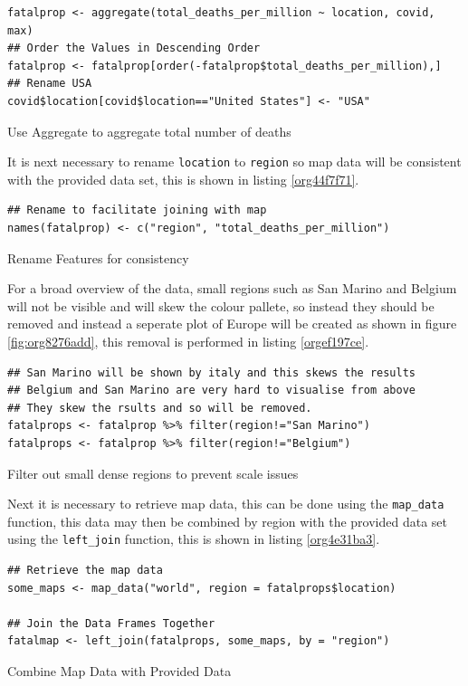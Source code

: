 \documentclass[11pt]{article}
\begin{document}
\begin{listing}[htbp]
\begin{verbatim}
fatalprop <- aggregate(total_deaths_per_million ~ location, covid, max)
## Order the Values in Descending Order
fatalprop <- fatalprop[order(-fatalprop$total_deaths_per_million),]
## Rename USA
covid$location[covid$location=="United States"] <- "USA"
\end{verbatim}
\caption{\label{org420cba7}Use Aggregate to aggregate total number of deaths}
\end{listing}


It is next necessary to rename \texttt{location} to \texttt{region} so map data will be
consistent with the provided data set, this is shown in listing \ref{org44f7f71}.

\begin{listing}[htbp]
\begin{verbatim}
## Rename to facilitate joining with map
names(fatalprop) <- c("region", "total_deaths_per_million")
\end{verbatim}
\caption{\label{org44f7f71}Rename Features for consistency}
\end{listing}

For a broad overview of the data, small regions such as San Marino and Belgium
will not be visible and will skew the colour pallete, so instead they should be removed
and instead a seperate plot of Europe will be created as shown in figure \ref{fig:org8276add}, this removal is performed in
listing \ref{orgef197ce}.

\begin{listing}[htbp]
\begin{verbatim}
## San Marino will be shown by italy and this skews the results
## Belgium and San Marino are very hard to visualise from above
## They skew the rsults and so will be removed.
fatalprops <- fatalprop %>% filter(region!="San Marino")
fatalprops <- fatalprop %>% filter(region!="Belgium")
\end{verbatim}
\caption{\label{orgef197ce}Filter out small dense regions to prevent scale issues}
\end{listing}


Next it is necessary to retrieve map data, this can be done using the \texttt{map\_data}
function, this data may then be combined by region with the provided data set
using the \texttt{left\_join} function, this is shown in listing \ref{org4e31ba3}.

\begin{listing}[htbp]
\begin{verbatim}
## Retrieve the map data
some_maps <- map_data("world", region = fatalprops$location)

## Join the Data Frames Together
fatalmap <- left_join(fatalprops, some_maps, by = "region")
\end{verbatim}
\caption{\label{org4e31ba3}Combine Map Data with Provided Data}
\end{listing}
\end{document}
